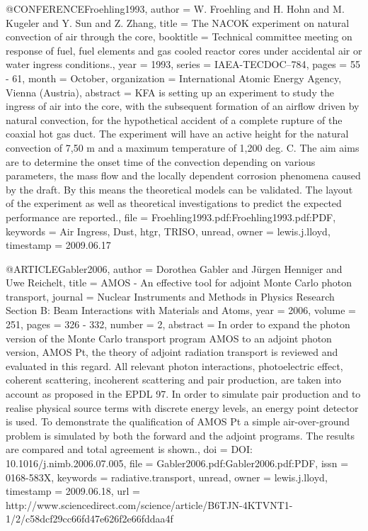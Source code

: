 {@CONFERENCE{Froehling1993,
  author = {W. Froehling and H. Hohn and M. Kugeler and Y. Sun and Z. Zhang},
  title = {The NACOK experiment on natural convection of air through the core},
  booktitle = {Technical committee meeting on response of fuel, fuel elements and
	gas cooled reactor cores under accidental air or water ingress conditions.},
  year = {1993},
  series = {IAEA-TECDOC--784},
  pages = {55 - 61},
  month = {October},
  organization = {International Atomic Energy Agency, Vienna (Austria)},
  abstract = {KFA is setting up an experiment to study the ingress of air into the
	core, with the subsequent formation of an airflow driven by natural
	convection, for the hypothetical accident of a complete rupture of
	the coaxial hot gas duct. The experiment will have an active height
	for the natural convection of 7,50 m and a maximum temperature of
	1,200 deg. C. The aim aims are to determine the onset time of the
	convection depending on various parameters, the mass flow and the
	locally dependent corrosion phenomena caused by the draft. By this
	means the theoretical models can be validated. The layout of the
	experiment as well as theoretical investigations to predict the expected
	performance are reported.},
  file = {Froehling1993.pdf:Froehling1993.pdf:PDF},
  keywords = {Air Ingress, Dust, htgr, TRISO, unread},
  owner = {lewis.j.lloyd},
  timestamp = {2009.06.17}
}

@ARTICLE{Gabler2006,
  author = {Dorothea Gabler and Jürgen Henniger and Uwe Reichelt},
  title = {AMOS - An effective tool for adjoint Monte Carlo photon transport},
  journal = {Nuclear Instruments and Methods in Physics Research Section B: Beam
	Interactions with Materials and Atoms},
  year = {2006},
  volume = {251},
  pages = {326 - 332},
  number = {2},
  abstract = {In order to expand the photon version of the Monte Carlo transport
	program AMOS to an adjoint photon version, AMOS Pt, the theory of
	adjoint radiation transport is reviewed and evaluated in this regard.
	All relevant photon interactions, photoelectric effect, coherent
	scattering, incoherent scattering and pair production, are taken
	into account as proposed in the EPDL 97. In order to simulate pair
	production and to realise physical source terms with discrete energy
	levels, an energy point detector is used. To demonstrate the qualification
	of AMOS Pt a simple air-over-ground problem is simulated by both
	the forward and the adjoint programs. The results are compared and
	total agreement is shown.},
  doi = {DOI: 10.1016/j.nimb.2006.07.005},
  file = {Gabler2006.pdf:Gabler2006.pdf:PDF},
  issn = {0168-583X},
  keywords = {radiative.transport, unread},
  owner = {lewis.j.lloyd},
  timestamp = {2009.06.18},
  url = {http://www.sciencedirect.com/science/article/B6TJN-4KTVNT1-1/2/c58dcf29cc66fd47e626f2e66fddaa4f}
}

}

